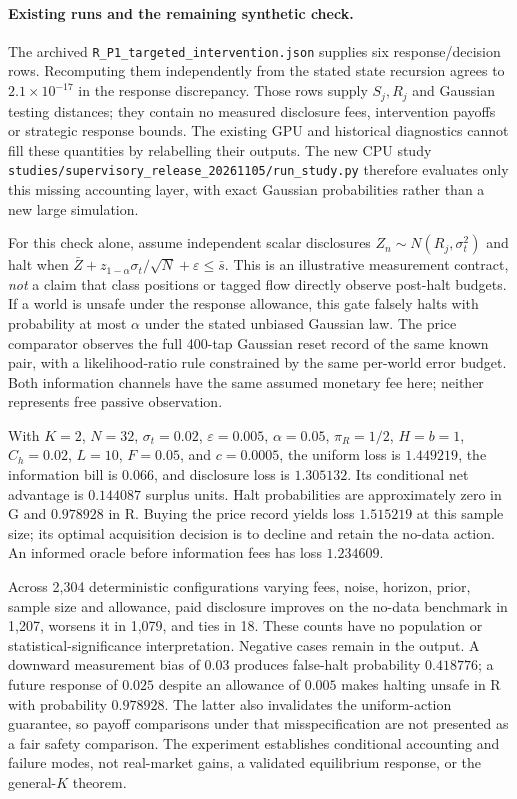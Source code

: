 \documentclass[12pt]{article}
\theoremstyle{definition}
\theoremstyle{remark}
\begin{document}
\paragraph{Existing runs and the remaining synthetic check.} The archived \nolinkurl{R_P1_targeted_intervention.json} supplies six response/decision rows. Recomputing them independently from the stated state recursion agrees to $2.1\times10^{-17}$ in the response discrepancy. Those rows supply $S_j,R_j$ and Gaussian testing distances; they contain no measured disclosure fees, intervention payoffs or strategic response bounds. The existing GPU and historical diagnostics cannot fill these quantities by relabelling their outputs. The new CPU study \nolinkurl{studies/supervisory_release_20261105/run_study.py} therefore evaluates only this missing accounting layer, with exact Gaussian probabilities rather than a new large simulation.

For this check alone, assume independent scalar disclosures $Z_n\sim N(R_j,\sigma_t^2)$ and halt when $\bar Z+z_{1-\alpha}\sigma_t/\sqrt N+\varepsilon\le\bar s$. This is an illustrative measurement contract, \emph{not} a claim that class positions or tagged flow directly observe post-halt budgets. If a world is unsafe under the response allowance, this gate falsely halts with probability at most $\alpha$ under the stated unbiased Gaussian law. The price comparator observes the full 400-tap Gaussian reset record of the same known pair, with a likelihood-ratio rule constrained by the same per-world error budget. Both information channels have the same assumed monetary fee here; neither represents free passive observation.

With $K=2$, $N=32$, $\sigma_t=0.02$, $\varepsilon=0.005$, $\alpha=0.05$, $\pi_R=1/2$, $H=b=1$, $C_h=0.02$, $L=10$, $F=0.05$, and $c=0.0005$, the uniform loss is $1.449219$, the information bill is $0.066$, and disclosure loss is $1.305132$. Its conditional net advantage is $0.144087$ surplus units. Halt probabilities are approximately zero in G and $0.978928$ in R. Buying the price record yields loss $1.515219$ at this sample size; its optimal acquisition decision is to decline and retain the no-data action. An informed oracle before information fees has loss $1.234609$.

Across 2,304 deterministic configurations varying fees, noise, horizon, prior, sample size and allowance, paid disclosure improves on the no-data benchmark in 1,207, worsens it in 1,079, and ties in 18. These counts have no population or statistical-significance interpretation. Negative cases remain in the output. A downward measurement bias of $0.03$ produces false-halt probability $0.418776$; a future response of $0.025$ despite an allowance of $0.005$ makes halting unsafe in R with probability $0.978928$. The latter also invalidates the uniform-action guarantee, so payoff comparisons under that misspecification are not presented as a fair safety comparison. The experiment establishes conditional accounting and failure modes, not real-market gains, a validated equilibrium response, or the general-$K$ theorem.
\end{document}
